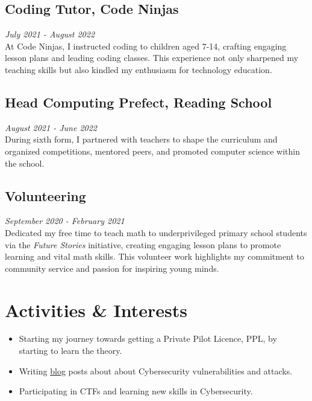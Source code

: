 \documentclass[11pt,a4paper,sans]{moderncv}        %
\begin{document}
\begin{multicols}{2}
\subsection{Coding Tutor, Code Ninjas}
\textit{July 2021 - August 2022}\\
At Code Ninjas, I instructed coding to children aged 7-14, crafting engaging lesson plans and leading coding classes. This experience not only sharpened my teaching skills but also kindled my enthusiasm for technology education.
\vspace{5pt}
\subsection{Head Computing Prefect, Reading School}
\textit{August 2021 - June 2022}\\
During sixth form, I partnered with teachers to shape the curriculum and organized competitions, mentored peers, and promoted computer science within the school. 
\vspace{5pt}
\subsection{Volunteering}
\textit{September 2020 - February 2021}\\
Dedicated my free time to teach math to underprivileged primary school students via the \textit{Future Stories} initiative, creating engaging lesson plans to promote learning and vital math skills. This volunteer work highlights my commitment to community service and passion for inspiring young minds. 
\\

\section{Activities \& Interests}

\begin{itemize}
\item{Starting my journey towards getting a Private Pilot Licence, PPL, by starting to learn the theory.}
\vspace{5pt}

\item{Writing \href{https://cyberblog.notion.site/Cybersecurity-Blog-af4e87264ae0480584d36d45a18eb337?pvs=4}{blog} posts about about Cybersecurity vulnerabilities and attacks.}
\vspace{5pt}

\item{Participating in CTFs and learning new skills in Cybersecurity.}
\vspace{5pt}


\end{itemize}
\end{multicols}
\end{document}
